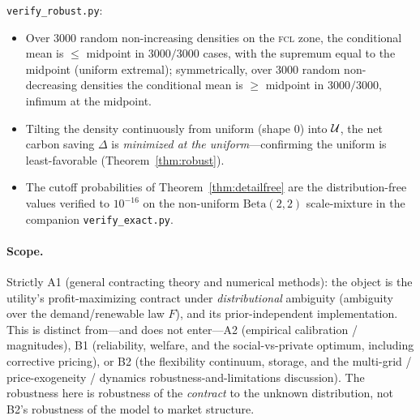 \documentclass[11pt,reqno]{amsart}
\theoremstyle{plain}
\theoremstyle{definition}\newtheorem{definition}{Definition}\newtheorem{assumption}{Assumption}
\theoremstyle{remark}\newtheorem{remark}{Remark}
\begin{document}
\texttt{verify\_robust.py}:
\begin{itemize}[leftmargin=1.6em]
  \item Over $3000$ random non-increasing densities on the \textsc{fcl} zone, the
        conditional mean is $\le$ midpoint in $3000/3000$ cases, with the supremum
        equal to the midpoint (uniform extremal); symmetrically, over $3000$ random
        non-decreasing densities the conditional mean is $\ge$ midpoint in
        $3000/3000$, infimum at the midpoint.
  \item Tilting the density continuously from uniform (shape $0$) into $\mathcal U$, the
        net carbon saving $\Delta$ is \emph{minimized at the uniform}---confirming
        the uniform is least-favorable (Theorem~\ref{thm:robust}).
  \item The cutoff probabilities of Theorem~\ref{thm:detailfree} are the
        distribution-free values verified to $10^{-16}$ on the non-uniform
        $\mathrm{Beta}(2,2)$ scale-mixture in the companion \texttt{verify\_exact.py}.
\end{itemize}

\paragraph{Scope.} Strictly A1 (general contracting theory and numerical methods):
the object is the utility's profit-maximizing contract under \emph{distributional}
ambiguity (ambiguity over the demand/renewable law $F$), and its prior-independent
implementation. This is distinct from---and does not enter---A2 (empirical
calibration / magnitudes), B1 (reliability, welfare, and the social-vs-private
optimum, including corrective pricing), or B2 (the flexibility continuum, storage,
and the multi-grid / price-exogeneity / dynamics robustness-and-limitations
discussion). The robustness here is robustness of the \emph{contract} to the
unknown distribution, not B2's robustness of the model to market structure.
\end{document}
